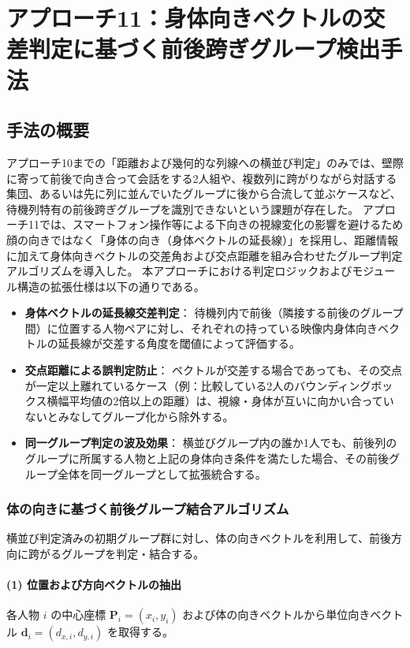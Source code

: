 \section{アプローチ11：身体向きベクトルの交差判定に基づく前後跨ぎグループ検出手法}

\subsection{手法の概要}
アプローチ10までの「距離および幾何的な列線への横並び判定」のみでは、壁際に寄って前後で向き合って会話をする2人組や、複数列に跨がりながら対話する集団、あるいは先に列に並んでいたグループに後から合流して並ぶケースなど、待機列特有の前後跨ぎグループを識別できないという課題が存在した。
アプローチ11では、スマートフォン操作等による下向きの視線変化の影響を避けるため顔の向きではなく「身体の向き（身体ベクトルの延長線）」を採用し、距離情報に加えて身体向きベクトルの交差角および交点距離を組み合わせたグループ判定アルゴリズムを導入した。
本アプローチにおける判定ロジックおよびモジュール構造の拡張仕様は以下の通りである。

\begin{itemize}
    \item \textbf{身体ベクトルの延長線交差判定}：
    待機列内で前後（隣接する前後のグループ間）に位置する人物ペアに対し、それぞれの持っている映像内身体向きベクトルの延長線が交差する角度を閾値によって評価する。
    \item \textbf{交点距離による誤判定防止}：
    ベクトルが交差する場合であっても、その交点が一定以上離れているケース（例：比較している2人のバウンディングボックス横幅平均値の2倍以上の距離）は、視線・身体が互いに向かい合っていないとみなしてグループ化から除外する。
    \item \textbf{同一グループ判定の波及効果}：
    横並びグループ内の誰か1人でも、前後列のグループに所属する人物と上記の身体向き条件を満たした場合、その前後グループ全体を同一グループとして拡張統合する。
\end{itemize}

\subsubsection{体の向きに基づく前後グループ結合アルゴリズム}
横並び判定済みの初期グループ群に対し、体の向きベクトルを利用して、前後方向に跨がるグループを判定・結合する。

\paragraph{(1) 位置および方向ベクトルの抽出}
各人物 $i$ の中心座標 $\mathbf{P}_i = (x_i, y_i)$ および体の向きベクトルから単位向きベクトル $\mathbf{d}_i = (d_{x,i}, d_{y,i})$ を取得する。

